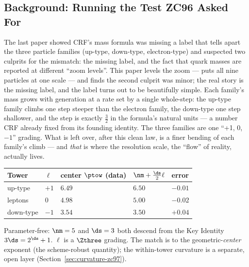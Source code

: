\documentclass[12pt, a4paper]{article}
\begin{document}
\subsection{Background: Running the Test ZC96 Asked For}
\label{sec:background-zc97}

\begin{keybox}[title={If you are just arriving --- ZC97 in plain language}]
\sloppy
The last paper showed CRF's mass formula was missing a label that tells apart
the three particle families (up-type, down-type, electron-type) and suspected
two culprits for the mismatch: the missing label, and the fact that quark masses
are reported at different ``zoom levels''. This paper levels the zoom --- puts
all nine particles at one scale --- and finds the second culprit was minor; the
real story is the missing label, and the label turns out to be beautifully
simple. Each family's mass grows with generation at a rate set by a single
whole-step: the up-type family climbs one step steeper than the electron family,
the down-type one step shallower, and the step is exactly $\tfrac32$ in the
formula's natural units --- a number CRF already fixed from its founding
identity. The three families are one ``+1, 0, $-1$'' grading. What is left over,
after this clean law, is a finer bending of each family's climb --- and \emph{that}
is where the resolution scale, the ``flow'' of reality, actually lives.
\end{keybox}

\begin{keybox}[title={Numerical Summary --- the center law (common scale $\Mz$)}]
{\footnotesize\renewcommand{\arraystretch}{1.3}
\begin{center}
\begin{tabular}{@{}p{3.0cm}p{1.6cm}p{2.7cm}p{2.7cm}p{1.6cm}@{}}
\toprule
\textbf{Tower} & \textbf{$\ell$} & \textbf{center $\ptow$ (data)} &
\textbf{$\nm+\tfrac{\ds}{2}\ell$} & \textbf{error} \\
\midrule
up-type   & $+1$ & $6.49$ & $6.50$ & $-0.01$ \\
leptons   & $0$  & $4.98$ & $5.00$ & $-0.02$ \\
down-type & $-1$ & $3.54$ & $3.50$ & $+0.04$ \\
\bottomrule
\end{tabular}
\end{center}}
\smallskip
\footnotesize Parameter-free: $\nm=5$ and $\ds=3$ both descend from the Key
Identity $3\ds=2^{\ds}+1$. $\ell$ is a $\Zthree$ grading. The match is to the
geometric-\emph{center} exponent (the scheme-robust quantity); the within-tower
curvature is a separate, open layer (Section~\ref{sec:curvature-zc97}).
\end{keybox}
\end{document}
